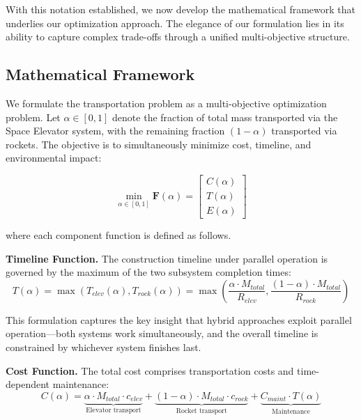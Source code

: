 \documentclass[12pt]{article}
\begin{document}
	With this notation established, we now develop the mathematical framework that underlies our optimization approach. The elegance of our formulation lies in its ability to capture complex trade-offs through a unified multi-objective structure.
	
	\subsection{Mathematical Framework}
	
	We formulate the transportation problem as a multi-objective optimization problem. Let $\alpha \in [0,1]$ denote the fraction of total mass transported via the Space Elevator system, with the remaining fraction $(1-\alpha)$ transported via rockets. The objective is to simultaneously minimize cost, timeline, and environmental impact:
	
	\begin{equation}
		\min_{\alpha \in [0,1]} \mathbf{F}(\alpha) = \begin{bmatrix} C(\alpha) \\ T(\alpha) \\ E(\alpha) \end{bmatrix}
	\end{equation}
	
	\noindent where each component function is defined as follows.
	
	\textbf{Timeline Function.} The construction timeline under parallel operation is governed by the maximum of the two subsystem completion times:
	\begin{equation}
		T(\alpha) = \max\left(T_{elev}(\alpha), T_{rock}(\alpha)\right) = \max\left(\frac{\alpha \cdot M_{total}}{R_{elev}}, \frac{(1-\alpha) \cdot M_{total}}{R_{rock}}\right)
	\end{equation}
	
	This formulation captures the key insight that hybrid approaches exploit parallel operation---both systems work simultaneously, and the overall timeline is constrained by whichever system finishes last.
	
	\textbf{Cost Function.} The total cost comprises transportation costs and time-dependent maintenance:
	\begin{equation}
		C(\alpha) = \underbrace{\alpha \cdot M_{total} \cdot c_{elev}}_{\text{Elevator transport}} + \underbrace{(1-\alpha) \cdot M_{total} \cdot c_{rock}}_{\text{Rocket transport}} + \underbrace{C_{maint} \cdot T(\alpha)}_{\text{Maintenance}}
	\end{equation}
	
\end{document}
